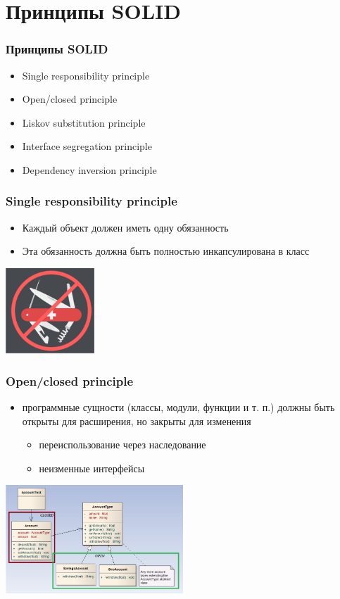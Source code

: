 \documentclass[xetex,mathserif,serif]{beamer}
\begin{document}
	\section{Принципы SOLID}

	\begin{frame}
		\frametitle{Принципы SOLID}
		\begin{itemize}
			\item Single responsibility principle
			\item Open/closed principle
			\item Liskov substitution principle
			\item Interface segregation principle
			\item Dependency inversion principle
		\end{itemize}
	\end{frame}

	\begin{frame}
		\frametitle{Single responsibility principle}
		\begin{itemize}
			\item Каждый объект должен иметь одну обязанность
			\item Эта обязанность должна быть полностью инкапсулирована в класс
		\end{itemize}
		\begin{flushright}
			\includegraphics[width=0.25\textwidth]{singleResponsibility.png}
		\end{flushright}
	\end{frame}

	\begin{frame}
		\frametitle{Open/closed principle}
		\begin{itemize}
			\item программные сущности (классы, модули, функции и т. п.) должны быть открыты для расширения, но закрыты для изменения
			\begin{itemize}
				\item переиспользование через наследование
				\item неизменные интерфейсы
			\end{itemize}
		\end{itemize}
		\begin{flushright}
			\includegraphics[width=0.5\textwidth]{openClosedPrinciple.png}
		\end{flushright}
	\end{frame}
\end{document}
